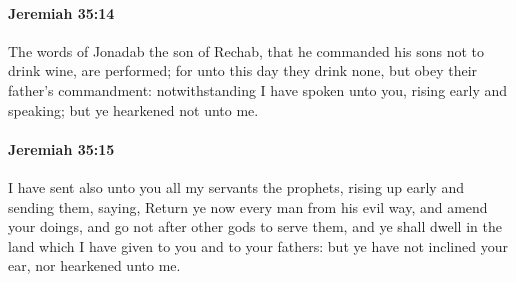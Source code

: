 		\paragraph{Jeremiah 35:14} %
			\label{JEREMIAH-35-14}

			The words of Jonadab the son of Rechab, that he commanded his sons not to drink wine, are performed; for unto this day they drink none, but obey their father’s commandment: notwithstanding I have spoken unto you, rising early and speaking; but ye hearkened not unto me.


		\paragraph{Jeremiah 35:15} %
			\label{JEREMIAH-35-15}

			I have sent also unto you all my servants the prophets, rising up early and sending them, saying, Return ye now every man from his evil way, and amend your doings, and go not after other gods to serve them, and ye shall dwell in the land which I have given to you and to your fathers: but ye have not inclined your ear, nor hearkened unto me.

